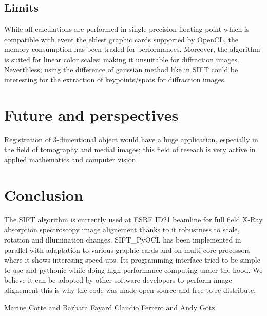 \documentclass[preprint]{iucr}
\begin{document}
\subsection{Limits}
While all calculations are performed in single precision floating point which is
compatible with event the eldest graphic cards supported by OpenCL, the memory
consumption has been traded for performances. Moreover, the algorithm is suited
for linear color scales; making it unsuitable for diffraction images.
Neverthless; using the difference of gaussian method like in
SIFT could be interesting for the extraction of keypoints/spots for diffraction
images.


\section{Future and perspectives}

Registration of 3-dimentional object would have a huge application, especially
in the field of tomography and medial images; this field of reseach is very
active in applied mathematics and computer vision.


\section{Conclusion}

The SIFT algorithm is currently used at ESRF ID21 beamline for full field X-Ray
absorption spectroscopy image alignement thanks to it robustness to scale,
rotation and illumination changes. 
SIFT\_PyOCL has been implemented in parallel with adaptation to various
graphic cards and on multi-core processors where it shows interesing speed-ups.
Its programming interface tried to be simple to use and pythonic while doing
high performance computing under the hood. We believe it can be adopted by other
software developers to perform image alignement this is why the code was made
open-source and free to re-distribute.



Marine Cotte and Barbara Fayard
Claudio Ferrero and Andy G\"otz



\end{document}
